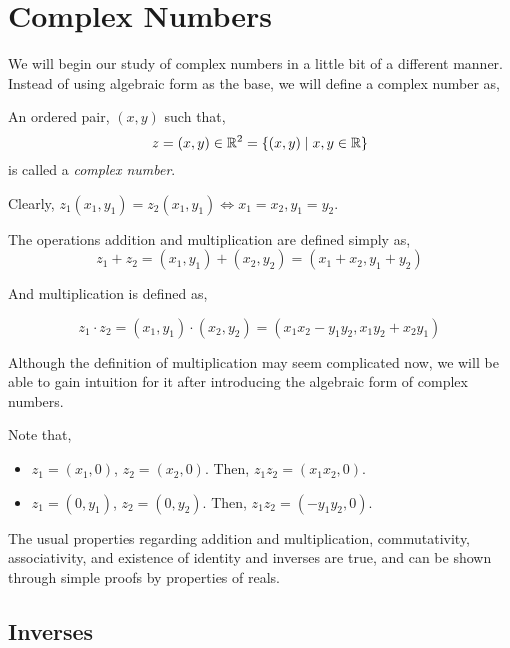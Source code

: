 \chapter{Complex Numbers}

We will begin our study of complex numbers in a little bit of a 
different manner. Instead of using algebraic form as the base, we will
define a complex number as,


\begin{definition}
    An ordered pair, \((x, y)\) such that,
    \[
        z = (x, y) \in \mathbb R^2 = \left\{(x, y) \mid x, y \in \mathbb R \right\}
    \]
    is called a \emph{complex number}.
\end{definition}

Clearly, \(z_1(x_1, y_1) = z_2(x_1, y_1) \iff x_1 = x_2, y_1 = y_2\).


The operations addition and multiplication are defined simply as, 
\[
    z_1 + z_2 = (x_1, y_1) + (x_2, y_2) = (x_1 + x_2, y_1 + y_2)
\]

And multiplication is defined as,

\[
    z_1 \cdot z_2 = (x_1, y_1) \cdot (x_2, y_2) = (x_1x_2 - y_1y_2, x_1y_2 + x_2y_1)
\]

Although the definition of multiplication may seem complicated now, we will be able
to gain intuition for it after introducing the algebraic form of complex numbers.

\begin{remark}
    Note that,
    \begin{itemize}
        \item \(z_{1} = (x_{1}, 0)\), \(z_2 = (x_2, 0)\). Then, \(z_1z_2 = (x_1x_2, 0)\).
        \item \(z_1 = (0, y_1)\), \(z_2 = (0, y_2)\). Then, \(z_1z_2 = (-y_1y_2, 0)\).
    \end{itemize}
\end{remark}

The usual properties regarding addition and multiplication, commutativity, associativity, and existence of identity
and inverses are true, and can be shown through simple proofs by properties of reals.

\section{Inverses}

